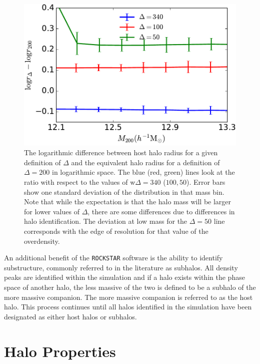 \documentclass[usenatbib,fleqn]{mnras}
\begin{document}
\begin{figure}
\centering
\includegraphics[width=\columnwidth]{rdeltacompare.pdf}
\caption{
The logarithmic difference between host halo radius for a given definition of $\Delta$ and the equivalent halo radius for a definition of $\Delta=200$ in logarithmic space. The blue (red, green) lines look at the ratio with respect to the values of w$\Delta=340$ ($100, 50$). Error bars show one standard deviation of the distribution in that mass bin. Note that while the expectation is that the halo mass will be larger for lower values of $\Delta$, there are some differences due to differences in halo identification. The deviation at low mass for the $\Delta=50$ line corresponds with the edge of resolution for that value of the overdensity. 
}
\label{fig:radiusmatch}
\end{figure}

An additional benefit of the {\tt ROCKSTAR} software is the ability to identify substructure, commonly referred to in the literature as subhalos. All density peaks are identified within the simulation and if a halo exists within the phase space of another halo, the less massive of the two is defined to be a subhalo of the more massive companion. The more massive companion is referred to as the host halo. This process continues until all halos identified in the simulation have been designated as either host halos or subhalos.

\section{Halo Properties}
\label{section:haloprops}
\end{document}
